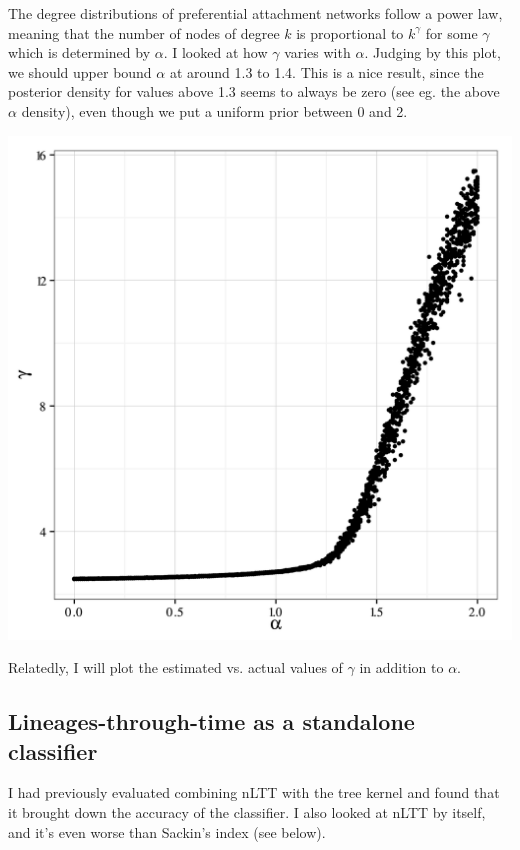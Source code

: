 \documentclass{article}
\begin{document}
The degree distributions of preferential attachment networks follow a power
law, meaning that the number of nodes of degree $k$ is proportional to
$k^\gamma$ for some $\gamma$ which is determined by $\alpha$. I looked at how
$\gamma$ varies with $\alpha$. Judging by this plot, we should upper bound
$\alpha$ at around 1.3 to 1.4. This is a nice result, since the posterior
density for values above 1.3 seems to always be zero (see eg. the above
$\alpha$ density), even though we put a uniform prior between 0 and 2.

\includegraphics[scale=0.15]{gamma-alpha}

Relatedly, I will plot the estimated vs. actual values of $\gamma$ in addition
to $\alpha$.

\subsection*{Lineages-through-time as a standalone classifier}

I had previously evaluated combining nLTT with the tree kernel and found that
it brought down the accuracy of the classifier. I also looked at nLTT by itself,
and it's even worse than Sackin's index (see below).
\end{document}
